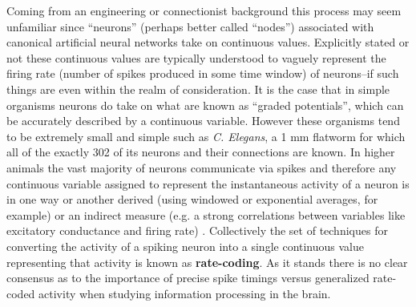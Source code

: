 Coming from an engineering or connectionist background this process may seem unfamiliar since ``neurons'' (perhaps better called ``nodes'') associated with canonical artificial neural networks take on continuous values. Explicitly stated or not these continuous values are typically understood to vaguely represent the firing rate (number of spikes produced in some time window) of neurons--if such things are even within the realm of consideration. It is the case that in simple organisms neurons do take on what are known as  ``graded potentials'', which can be accurately described by a continuous variable. However these organisms tend to be extremely small and simple such as \emph{C. Elegans}, a 1 mm flatworm for which all of the exactly 302 of its neurons and their connections are known. In higher animals the vast majority of neurons communicate via spikes and therefore any continuous variable assigned to represent the instantaneous activity of a neuron is in one way or another derived (using windowed or exponential averages, for example) or an indirect measure (e.g. a strong correlations between variables like excitatory conductance and firing rate) \cite{o2016leabra}. Collectively the set of techniques for converting the activity of a spiking neuron into a single continuous value representing that activity is known as \textbf{rate-coding}. As it stands there is no clear consensus as to the importance of precise spike timings versus generalized rate-coded activity when studying information processing in the brain.

